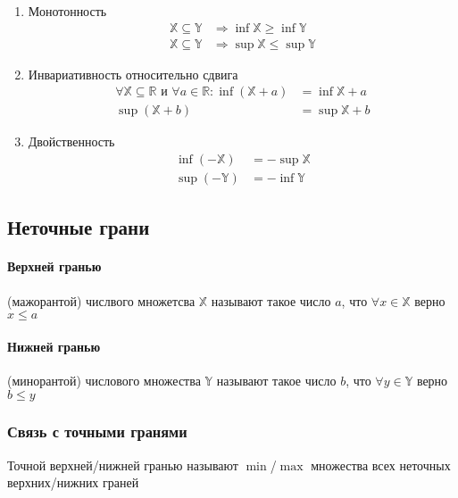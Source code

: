 \documentclass[class=article,a4paper,12pt,crop=false]{standalone}
\begin{document}
\begin{enumerate}
  \item {
    Монотонность
    \begin{equation}
      \begin{aligned}
        \mathbb{X} \subseteq \mathbb{Y} & \Rightarrow \inf{\mathbb{X}} \geq \inf{\mathbb{Y}} \\
        \mathbb{X} \subseteq \mathbb{Y} & \Rightarrow \sup{\mathbb{X}} \leq \sup{\mathbb{Y}}
      \end{aligned}
    \end{equation}
  }
  \item {
    Инвариативность относительно сдвига
    \begin{equation}
      \begin{aligned}
        \forall \mathbb{X} \subseteq \mathbb{R} \text{ и } \forall a \in \mathbb{R}: \inf{(\mathbb{X} + a)} & = \inf{\mathbb{X}} + a\\
         \sup{(\mathbb{X} + b)} & = \sup{\mathbb{X}} + b
      \end{aligned}
    \end{equation}
  }
  \item {
    Двойственность
    \begin{equation}
      \begin{aligned}
        \inf{(-\mathbb{X})} & = -\sup{\mathbb{X}} \\
        \sup{(-\mathbb{Y})} & = -\inf{\mathbb{Y}}
      \end{aligned}
    \end{equation}
  }
\end{enumerate}

\subsection{Неточные грани}

\paragraph{Верхней гранью} (мажорантой) числвого множетсва $\mathbb{X}$ называют такое число 
$a$, что $\forall x \in \mathbb{X}$ верно $x \leq a$

\paragraph{Нижней гранью} (минорантой) числового множества $\mathbb{Y}$ называют такое число
$b$, что $\forall y \in \mathbb{Y}$ верно $b \leq y$

\subsubsection{Связь с точными гранями}

Точной верхней/нижней гранью называют $\min$/$\max$ множества всех неточных верхних/нижних граней
\end{document}
